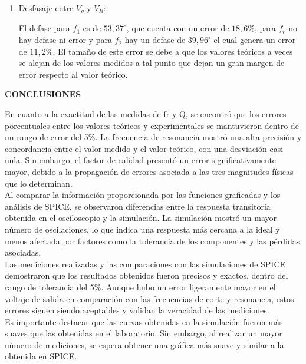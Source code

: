 \documentclass[12pt]{article}
\begin{document}
\begin{enumerate}
    	\item Desfasaje entre $V_g$ y $V_R$:
    	
    	\noindent El defase para $f_1$ es de $53,37^\circ$, que cuenta con un error de $18,6\%$, para $f_r$ no hay defase ni error y para $f_2$ hay un defase de $39,96^\circ$ el cual genera un error de $11,2\%$. El tamaño de este error se debe a que los valores teóricos a veces se alejan de los valores medidos a tal punto que dejan un gran margen de error respecto al valor teórico.
    	
    \end{enumerate}
    
    
    \newpage
    
    \begin{center}
        \textbf{\large CONCLUSIONES}\\
    \end{center}
    
    En cuanto a la exactitud de las medidas de fr y Q, se encontró que los errores porcentuales entre los valores teóricos y experimentales se mantuvieron dentro de un rango de error del 5\%. La frecuencia de resonancia mostró una alta precisión y concordancia entre el valor medido y el valor teórico, con una desviación casi nula. Sin embargo, el factor de calidad presentó un error significativamente mayor, debido a la propagación de errores asociada a las tres magnitudes físicas que lo determinan.\\
    
    Al comparar la información proporcionada por las funciones graficadas y los análisis de SPICE, se observaron diferencias entre la respuesta transitoria obtenida en el osciloscopio y la simulación. La simulación mostró un mayor número de oscilaciones, lo que indica una respuesta más cercana a la ideal y menos afectada por factores como la tolerancia de los componentes y las pérdidas asociadas.\\
    
    Las mediciones realizadas y las comparaciones con las simulaciones de SPICE demostraron que los resultados obtenidos fueron precisos y exactos, dentro del rango de tolerancia del 5\%. Aunque hubo un error ligeramente mayor en el voltaje de salida en comparación con las frecuencias de corte y resonancia, estos errores siguen siendo aceptables y validan la veracidad de las mediciones.\\
    
    Es importante destacar que las curvas obtenidas en la simulación fueron más suaves que las obtenidas en el laboratorio. Sin embargo, al realizar un mayor número de mediciones, se espera obtener una gráfica más suave y similar a la obtenida en SPICE.\\
    
\end{document}
